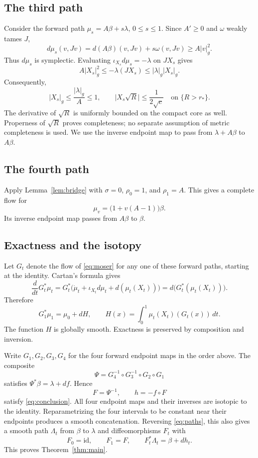 \documentclass[11pt,a4paper]{article}
\theoremstyle{remark}
\newcommand{\id}{\mathrm{id}}
\newcommand{\abs}[1]{\lvert #1\rvert}
\numberwithin{equation}{section}
\begin{document}
\subsection*{The third path}
Consider the forward path $\mu_s=A\beta+s\lambda$, $0\le s\le1$. Since $A'\ge0$ and $\omega$ weakly tames $J$,
\[
d\mu_s(v,Jv)=d(A\beta)(v,Jv)+s\omega(v,Jv)
\ge A\abs{v}_g^2.
\]
Thus $d\mu_s$ is symplectic. Evaluating $\iota_{X_s}d\mu_s=-\lambda$ on $JX_s$ gives
\[
A\abs{X_s}_g^2\le-\lambda(JX_s)
\le\abs{\lambda}_g\abs{X_s}_g.
\]
Consequently,
\begin{equation}\label{eq:thirdestimate}
\abs{X_s}_g\le\frac{\abs{\lambda}_g}{A}\le1,
\qquad \abs{X_s\sqrt R}\le\frac1{2\sqrt c}
\quad\text{on }\{R>r_*\}.
\end{equation}
The derivative of $\sqrt R$ is uniformly bounded on the compact core as well. Properness of $\sqrt R$ proves completeness; no separate assumption of metric completeness is used. We use the inverse endpoint map to pass from $\lambda+A\beta$ to $A\beta$.

\subsection*{The fourth path}
Apply Lemma~\ref{lem:bridge} with $\sigma=0$, $\rho_0=1$, and $\rho_1=A$. This gives a complete flow for
\[
\mu_v=\bigl(1+v(A-1)\bigr)\beta.
\]
Its inverse endpoint map passes from $A\beta$ to $\beta$.

\subsection*{Exactness and the isotopy}
Let $G_t$ denote the flow of \eqref{eq:moser} for any one of these forward paths, starting at the identity. Cartan's formula gives
\[
\frac d{dt}G_t^*\mu_t
=G_t^*\bigl(\dot\mu_t+\iota_{X_t}d\mu_t+d(\mu_t(X_t))\bigr)
=d\bigl(G_t^*(\mu_t(X_t))\bigr).
\]
Therefore
\begin{equation}\label{eq:exactness}
G_1^*\mu_1=\mu_0+dH,
\qquad H(x)=\int_0^1\mu_t(X_t)(G_t(x))\,dt.
\end{equation}
The function $H$ is globally smooth. Exactness is preserved by composition and inversion.

Write $G_1,G_2,G_3,G_4$ for the four forward endpoint maps in the order above. The composite
\[
\Psi=G_4^{-1}\circ G_3^{-1}\circ G_2\circ G_1
\]
satisfies $\Psi^*\beta=\lambda+df$. Hence
\[
F=\Psi^{-1},\qquad h=-f\circ F
\]
satisfy \eqref{eq:conclusion}. All four endpoint maps and their inverses are isotopic to the identity. Reparametrizing the four intervals to be constant near their endpoints produces a smooth concatenation. Reversing \eqref{eq:paths}, this also gives a smooth path $\Lambda_t$ from $\beta$ to $\lambda$ and diffeomorphisms $F_t$ with
\[
F_0=\id,\qquad F_1=F,\qquad
F_t^*\Lambda_t=\beta+dh_t.
\]
This proves Theorem~\ref{thm:main}.
\end{document}
